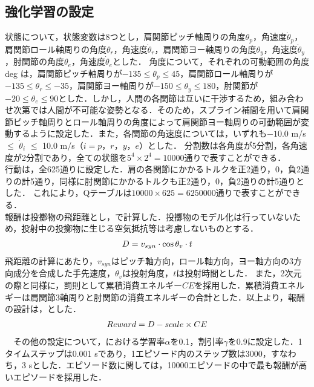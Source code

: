 \begin{small}
\subsection{強化学習の設定}
状態について，状態変数は8つとし，肩関節ピッチ軸周りの角度$\theta_{p}$，角速度$\dot{\theta}_{p}$，肩関節ロール軸周りの角度$\theta_{r}$，角速度$\dot{\theta}_{r}$，肩関節ヨー軸周りの角度$\theta_{y}$，角速度$\dot{\theta}_{y}$，肘関節の角度$\theta_{e}$，角速度$\dot{\theta}_{e}$とした．
角度について，それぞれの可動範囲の角度 deg は，肩関節ピッチ軸周りが$-135\leq\theta_{p}\leq45$，肩関節ロール軸周りが$-135\leq\theta_{r}\leq-35$，肩関節ヨー軸周りが$-150\leq\theta_{y}\leq180$，肘関節が$-20\leq\theta_{e}\leq90$とした．しかし，人間の各関節は互いに干渉するため，組み合わせ次第では人間が不可能な姿勢となる．そのため，スプライン補間\cite{spline}を用いて肩関節ピッチ軸周りとロール軸周りの角度によって肩関節ヨー軸周りの可動範囲が変動するように設定した．また，各関節の角速度については，いずれも$-10.0$ m/s $\le$ $\dot{\theta}_{i}$ $\le$ 10.0 m/s（$i = p，r，y，e$）とした．
分割数は各角度が5分割，各角速度が2分割であり，全ての状態を$5^{4}\times 2^{4}=10000$通りで表すことができる．\\
行動は，全625通りに設定した．肩の各関節にかかるトルクを正2通り，0，負2通りの計5通り，同様に肘関節にかかるトルクも正2通り，0，負2通りの計5通りとした．
これにより，Qテーブルは$10000 \times 625=6250000$通りで表すことができる．\\
報酬は投擲物の飛距離とし，で計算した．投擲物のモデル化は行っていないため，投射中の投擲物に生じる空気抵抗等は考慮しないものとする．
\begin{eqnarray}
  \equlabel{7}
  D = v_{syn} \cdot \cos\theta_{v} \cdot t
\end{eqnarray}
飛距離の計算にあたり，$v_{syn}$はピッチ軸方向，ロール軸方向，ヨー軸方向の3方向成分を合成した手先速度，$\theta_{v}$は投射角度，$t$は投射時間とした．
また，2次元の際と同様に，罰則として累積消費エネルギー$CE$を採用した．累積消費エネルギーは肩関節3軸周りと肘関節の消費エネルギーの合計とした．以上より，報酬の設計は，とした．
\begin{eqnarray}
  \equlabel{8}
  Reward = D - scale \times CE
\end{eqnarray}
　その他の設定について，における学習率$\alpha$を0.1，割引率$\gamma$を0.9に設定した．1タイムステップは0.001 sであり，1エピソード内のステップ数は3000，すなわち，3 sとした．エピソード数に関しては，10000エピソードの中で最も報酬が高いエピソードを採用した．

\end{small}

